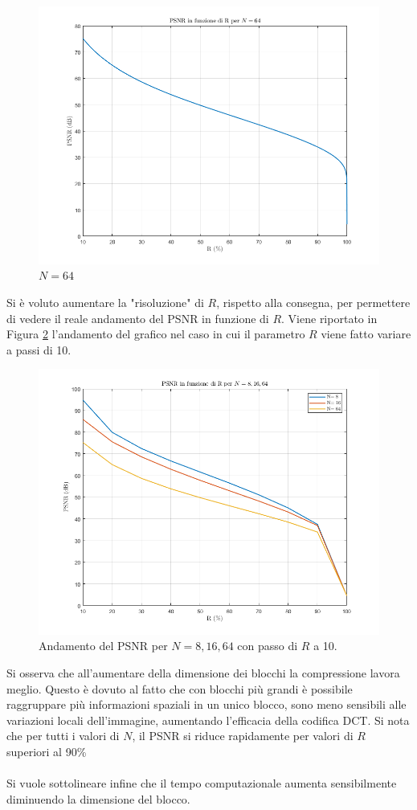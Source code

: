 \begin{figure}[H]
	\centering
	\includegraphics[width=0.75\linewidth]{RIS_N64.png}
	\caption{$N=64$}
	\label{fig:ris64}
\end{figure}
Si è voluto aumentare la "risoluzione" di $R$, rispetto alla consegna, per permettere di vedere il reale andamento del PSNR in funzione di $R$. Viene riportato in Figura \ref{fig:ris} l'andamento del grafico nel caso in cui il parametro $R$ viene fatto variare a passi di 10.
\begin{figure}[H]
	\centering
	\includegraphics[width=0.7\linewidth]{RIS_TOT.png}
	\caption{Andamento del PSNR per $N=8,16,64$ con passo di $R$ a 10.}
	\label{fig:ris}
\end{figure}
Si osserva che all'aumentare della dimensione dei blocchi la compressione lavora meglio. Questo è dovuto al fatto che con blocchi più grandi è possibile raggruppare più informazioni spaziali in un unico blocco, sono meno sensibili alle variazioni locali dell'immagine, aumentando l'efficacia della codifica DCT. Si nota che per tutti i valori di $N$, il PSNR si riduce rapidamente per valori di $R$ superiori al 90\%\\\\
Si vuole sottolineare infine che il tempo computazionale aumenta sensibilmente diminuendo la dimensione del blocco.
